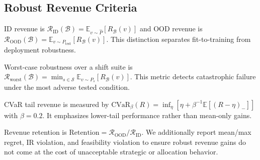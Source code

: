 \documentclass{article}
\newcommand{\E}{\mathbb{E}}
\begin{document}
\begin{table}[h]\centering\small
\caption{CATS distribution shift benchmark used in our experiments.}
\label{tab:shift_benchmark}
\end{table}

\subsection{Robust Revenue Criteria}
ID revenue is $\mathcal R_{\mathrm{ID}}(\mathcal B)=\E_{v\sim\widehat P}[R_{\mathcal B}(v)]$ and OOD revenue is $\mathcal R_{\mathrm{OOD}}(\mathcal B)=\E_{v\sim P_{\mathrm{test}}}[R_{\mathcal B}(v)]$. This distinction separates fit-to-training from deployment robustness.

Worst-case robustness over a shift suite is $\mathcal R_{\mathrm{worst}}(\mathcal B)=\min_{s\in\mathcal S}\E_{v\sim P_s}[R_{\mathcal B}(v)]$. This metric detects catastrophic failure under the most adverse tested condition.

CVaR tail revenue is measured by $\mathrm{CVaR}_{\beta}(R)=\inf_{\eta}[\eta+\beta^{-1}\E[(R-\eta)_-]]$ with $\beta=0.2$. It emphasizes lower-tail performance rather than mean-only gains.

Revenue retention is $\mathrm{Retention}=\mathcal R_{\mathrm{OOD}}/\mathcal R_{\mathrm{ID}}$. We additionally report mean/max regret, IR violation, and feasibility violation to ensure robust revenue gains do not come at the cost of unacceptable strategic or allocation behavior.
\end{document}
